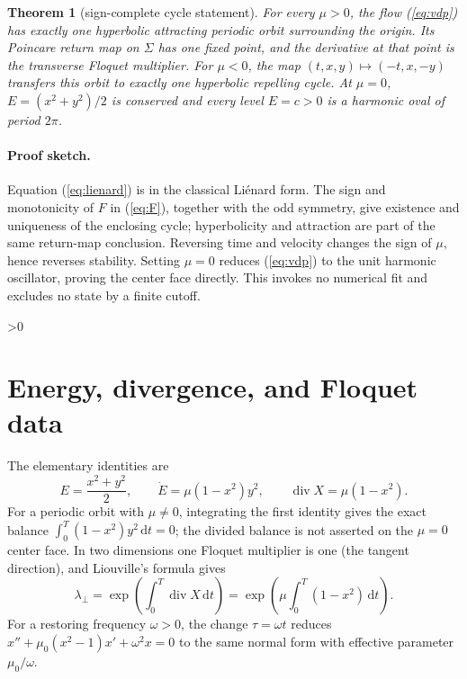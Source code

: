 \documentclass[10pt]{article}
\newtheorem{theorem}{Theorem}
\newcommand{\dd}{\,\mathrm d}
\begin{document}
\begin{theorem}[sign-complete cycle statement]
For every \(\mu>0\), the flow (\ref{eq:vdp}) has exactly one hyperbolic
attracting periodic orbit surrounding the origin.  Its Poincare return map on
\(\Sigma\) has one fixed point, and the derivative at that point is the
transverse Floquet multiplier.  For \(\mu<0\), the map
\((t,x,y)\mapsto(-t,x,-y)\) transfers this orbit to exactly one hyperbolic
repelling cycle.  At \(\mu=0\),
\(E=(x^2+y^2)/2\) is conserved and every level \(E=c>0\) is a harmonic oval
of period \(2\pi\).
\end{theorem}

\paragraph{Proof sketch.}
Equation (\ref{eq:lienard}) is in the classical Liénard form.  The sign and
monotonicity of \(F\) in (\ref{eq:F}), together with the odd symmetry, give
existence and uniqueness of the enclosing cycle; hyperbolicity and attraction
are part of the same return-map conclusion.  Reversing time and velocity
changes the sign of \(\mu\), hence reverses stability.  Setting \(\mu=0\)
reduces (\ref{eq:vdp}) to the unit harmonic oscillator, proving the center
face directly.  This invokes no numerical fit and excludes no state by a
finite cutoff.

\ifnum\CRevisionRound>0
\section{Energy, divergence, and Floquet data}
The elementary identities are
\begin{equation}
 E=\frac{x^2+y^2}{2},\qquad \dot E=\mu(1-x^2)y^2,\qquad
 \operatorname{div}X=\mu(1-x^2).
 \label{eq:identities}
\end{equation}
For a periodic orbit with \(\mu\ne0\), integrating the first identity gives
the exact balance \(\int_0^T(1-x^2)y^2\dd t=0\); the divided balance is not
asserted on the \(\mu=0\) center face.  In two dimensions one Floquet multiplier is
one (the tangent direction), and Liouville's formula gives
\begin{equation}
 \lambda_\perp=\exp\!\left(\int_0^T\operatorname{div}X\dd t\right)
 =\exp\!\left(\mu\int_0^T(1-x^2)\dd t\right).
 \label{eq:floquet}
\end{equation}
For a restoring frequency \(\omega>0\), the change \(\tau=\omega t\)
reduces \(x''+\mu_0(x^2-1)x'+\omega^2x=0\) to the same normal form with
effective parameter \(\mu_0/\omega\).
\fi
\end{document}

